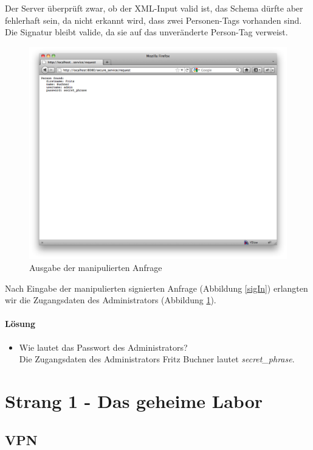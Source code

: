 \documentclass[12pt]{article}
\begin{document}
Der Server überprüft zwar, ob der XML-Input valid ist, das Schema dürfte aber fehlerhaft sein, da nicht erkannt wird, dass zwei Personen-Tags vorhanden sind. Die Signatur bleibt valide, da sie auf das unveränderte Person-Tag verweist. 
 \begin{figure}
  \begin{center}
    \includegraphics[scale=0.25]{images/sigOut.png}
  \end{center}
  \caption{Ausgabe der manipulierten Anfrage}
  \label{sigOut}
\end{figure}
Nach Eingabe der manipulierten signierten Anfrage (Abbildung \ref{sigIn}) erlangten wir die Zugangsdaten des Administrators (Abbildung \ref{sigOut}).

\paragraph{Lösung}
\begin{itemize}
	\item Wie lautet das Passwort des Administrators? \\
		Die Zugangsdaten des Administrators Fritz Buchner lautet \textit{secret\_phrase}.
\end{itemize}

\newpage
\section{Strang 1 - Das geheime Labor}

\subsection{VPN}
\end{document}
